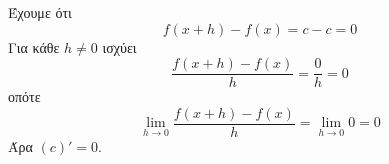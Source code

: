Έχουμε ότι
\[ f(x+h)-f(x)=c-c=0 \]
Για κάθε $ h\neq 0 $ ισχύει
\[ \frac{f(x+h)-f(x)}{h}=\frac{0}{h}=0 \]
οπότε
\[ \lim_{h\to 0}{\frac{f(x+h)-f(x)}{h}}=\lim_{h\to 0}{0}=0 \]
Άρα $ (c)'=0 $.
